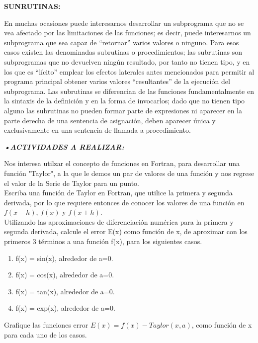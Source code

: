 \textbf{SUNRUTINAS:}

En muchas ocasiones puede interesarnos desarrollar un subprograma que no se vea afectado por las
limitaciones de las funciones; es decir, puede interesarnos un subprograma que sea capaz de “retornar” varios valores o
ninguno. Para esos casos existen las denominadas subrutinas o procedimientos; las subrutinas son subprogramas que
no devuelven ningún resultado, por tanto no tienen tipo, y en los que es “lícito” emplear los efectos laterales antes
mencionados para permitir al programa principal obtener varios valores “resultantes” de la ejecución del subprograma.
Las subrutinas se diferencian de las funciones fundamentalmente en la sintaxis de la definición y en la forma de
invocarlos; dado que no tienen tipo alguno las subrutinas no pueden formar parte de expresiones ni aparecer en la parte
derecha de una sentencia de asignación, deben aparecer única y exclusivamente en una sentencia de llamada a
procedimiento.




\textbf{\textit{•ACTIVIDADES A REALIZAR:}}


Nos interesa utilzar el concepto de funciones en Fortran, para desarrollar una función "Taylor", a la que le demos un par de valores de una función y nos regrese el valor de la Serie de Taylor para un punto.\\

Escriba una función de Taylor en Fortran, que utilice la primera y segunda derivada, por lo que requiere entonces de conocer los valores de una función en $f(x-h)$, $f(x)$  y $f(x+h)$. \\

Utilizando las aproximaciones de diferenciación numérica para la primera y segunda derivada, calcule el error E(x) como función de x, de aproximar con los primeros 3 términos a una función f(x), para los siguientes casos. \\

\begin{enumerate}

\item f(x) = sin(x), alrededor de a=0.
\item f(x) = cos(x), alrededor de a=0.
\item f(x) = tan(x), alrededor de a=0.
\item f(x) = exp(x), alrededor de a=0.

\end{enumerate}
 
 
 Grafique las funciones error $E(x)= f(x) - Taylor(x,a)$, como función de x para cada uno de los casos. \\
 
